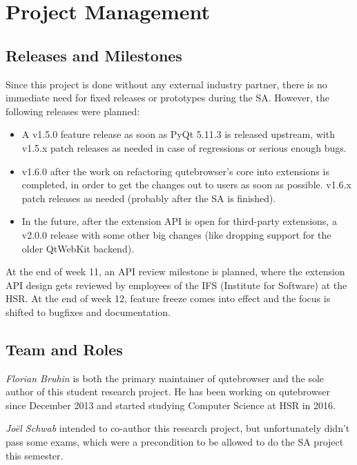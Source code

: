 
\chapter{Project Management}
\label{ch:projectman}

\section{Releases and Milestones}
\label{sec:releases}

Since this project is done without any external industry partner, there is no
immediate need for fixed releases or prototypes during the SA. However, the
following releases were planned:

\begin{itemize}
  \item A v1.5.0 feature release as soon as PyQt 5.11.3 is released upstream,
    with v1.5.x patch releases as needed in case of regressions or serious
    enough bugs.
  \item v1.6.0 after the work on refactoring qutebrowser's core into extensions
    is completed, in order to get the changes out to users as soon as possible.
    v1.6.x patch releases as needed (probably after the SA is finished).
  \item In the future, after the extension API is open for third-party
    extensions, a v2.0.0 release with some other big changes (like dropping support
    for the older QtWebKit backend).
\end{itemize}

At the end of week 11, an API review milestone is planned, where the extension
API design gets reviewed by employees of the IFS (Institute for Software) at the
HSR. At the end of week 12, feature freeze comes into effect and the focus is
shifted to bugfixes and documentation.

\section{Team and Roles}
\label{sec:team}
\emph{Florian Bruhin} is both the primary maintainer of qutebrowser and the
sole author of this student research project. He has been working on qutebrowser since
December 2013 and started studying Computer Science at HSR in 2016.

\emph{Joël Schwab} intended to co-author this research project, but
unfortunately didn't pass some exams, which were a precondition to be allowed to
do the SA project this semester.

